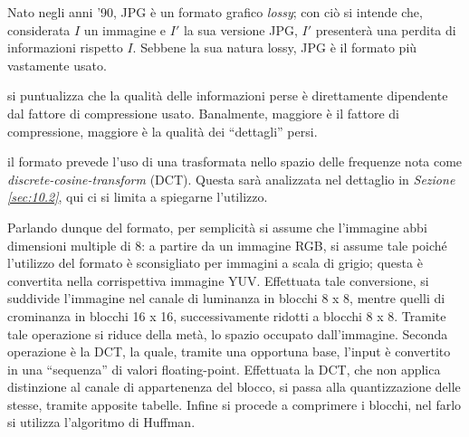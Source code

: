 \documentclass{subfiles}
\begin{document}
Nato negli anni '90, JPG è un formato grafico \emph{lossy}; con ciò si intende che, considerata \(I\) un immagine e \(I'\) la sua versione JPG,
\(I'\) presenterà una perdita di informazioni rispetto \(I\). Sebbene la sua natura lossy, JPG è il formato più vastamente usato.

\begin{Remark*}
    si puntualizza che la qualità delle informazioni perse è direttamente dipendente dal fattore di compressione usato. Banalmente,
    maggiore è il fattore di compressione, maggiore è la qualità dei ``dettagli'' persi.
\end{Remark*}

\begin{Note*}
    il formato prevede l'uso di una trasformata nello spazio delle frequenze nota come \emph{discrete-cosine-transform} (DCT).
    Questa sarà analizzata nel dettaglio in \emph{Sezione \ref{sec:10.2}}, qui ci si limita a spiegarne l'utilizzo.
\end{Note*}

Parlando dunque del formato, per semplicità si assume che l'immagine abbi dimensioni multiple di 8:
a partire da un immagine RGB, si assume tale poiché l'utilizzo del formato è sconsigliato per immagini a scala di grigio;
questa è convertita nella corrispettiva immagine YUV. Effettuata tale conversione, si suddivide l'immagine nel canale di luminanza in blocchi 8 x 8,
mentre quelli di crominanza in blocchi 16 x 16, successivamente ridotti a blocchi 8 x 8.
Tramite tale operazione si riduce della metà, lo spazio occupato dall'immagine.
Seconda operazione è la DCT, la quale, tramite una opportuna base, l'input è convertito in una ``sequenza'' di valori floating-point.
Effettuata la DCT, che non applica distinzione al canale di appartenenza del blocco, si passa alla quantizzazione delle stesse, tramite apposite tabelle.
Infine si procede a comprimere i blocchi, nel farlo si utilizza l'algoritmo di Huffman.
\end{document}
